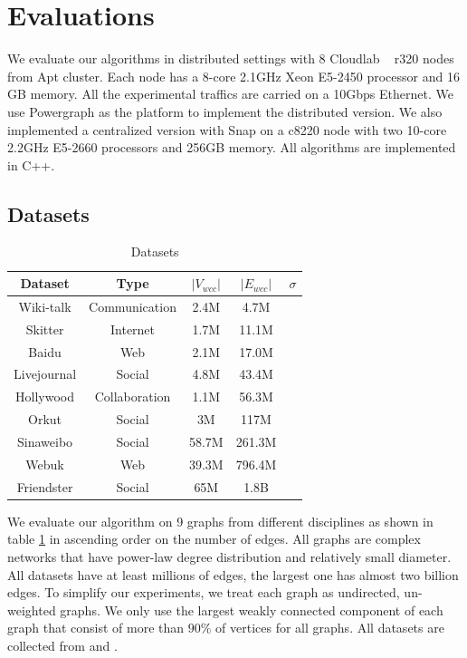 \section{Evaluations}
\label{evaluation}

We evaluate our algorithms in distributed settings with 8 Cloudlab ~\cite{RicciEide:login14} r320 nodes from Apt cluster. Each node has a 8-core 2.1GHz Xeon E5-2450 processor and 16 GB memory. All the experimental traffics are carried on a 10Gbps Ethernet. We use Powergraph \cite{180251} as the platform to implement the distributed version. We also implemented a centralized version with Snap \cite{snapnets} on a c8220 node with two 10-core 2.2GHz E5-2660 processors and 256GB memory. All algorithms are implemented in C++.

\subsection{Datasets}

\begin{table}
    \centering
    \begin{tabular}{|c|c|c|c|c|} \hline
        Dataset & Type & $|V_{wcc}|$ & $|E_{wcc}|$ & $\sigma$ \\ \hline
				Wiki-talk & Communication & 2.4M & 4.7M &\\ \hline
        Skitter & Internet & 1.7M & 11.1M &\\ \hline
				Baidu & Web & 2.1M & 17.0M &\\ \hline
        Livejournal & Social & 4.8M & 43.4M &\\ \hline
				Hollywood & Collaboration & 1.1M & 56.3M &\\ \hline
        Orkut & Social & 3M & 117M &\\ \hline
				Sinaweibo & Social & 58.7M & 261.3M &\\ \hline
				Webuk & Web & 39.3M & 796.4M &\\ \hline
        Friendster & Social & 65M & 1.8B &\\ \hline
    \end{tabular}
    \caption{Datasets}
    \label{table:datasets}
\end{table}

We evaluate our algorithm on 9 graphs from different disciplines as shown in table \ref{table:datasets} in ascending order on the number of edges. All graphs are complex networks that have power-law degree distribution and relatively small diameter. All datasets have at least millions of edges, the largest one has almost two billion edges. To simplify our experiments, we treat each graph as undirected, un-weighted graphs. We only use the largest weakly connected component of each graph that consist of more than $90\%$ of vertices for all graphs. All datasets are collected from \cite{snapnets} and \cite{nr}.

